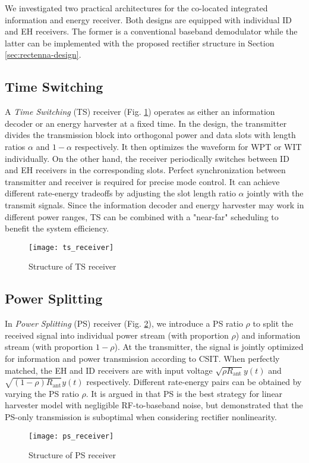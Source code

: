We investigated two practical architectures for the co-located integrated information and energy receiver. Both designs are equipped with individual ID and EH receivers. The former is a conventional baseband demodulator while the latter can be implemented with the proposed rectifier structure in Section \ref{sec:rectenna-design}.



\subsection{Time Switching}\label{sec:time-switching}
A \textit{Time Switching} (TS) receiver (Fig. \ref{fig:ts-receiver}) operates as either an information decoder or an energy harvester at a fixed time. In the design, the transmitter divides the transmission block into orthogonal power and data slots with length ratios $\alpha $ and $1 - \alpha $ respectively. It then optimizes the waveform for WPT or WIT individually. On the other hand, the receiver periodically switches between ID and EH receivers in the corresponding slots. Perfect synchronization between transmitter and receiver is required for precise mode control. It can achieve different rate-energy tradeoffs by adjusting the slot length ratio $\alpha $ jointly with the transmit signals. Since the information decoder and energy harvester may work in different power ranges, TS can be combined with a "near-far" scheduling \cite{Zhang2013} to benefit the system efficiency.

\begin{figure}[ht]
  \centering
    \texttt{[image: ts\_receiver]}
  \caption{Structure of TS receiver \cite{Clerckx2019}}
  \label{fig:ts-receiver}
\end{figure}



\subsection{Power Splitting}\label{sec:power-splitting}
In \textit{Power Splitting} (PS) receiver (Fig. \ref{fig:ps-receiver}), we introduce a PS ratio $\rho $ to split the received signal into individual power stream (with proportion $\rho $) and information stream (with proportion $1 - \rho $). At the transmitter, the signal is jointly optimized for information and power transmission according to CSIT. When perfectly matched, the EH and ID receivers are with input voltage $\sqrt {\rho {R_{{\text{ant}}}}} y(t)$ and $\sqrt {(1 - \rho ){R_{{\text{ant}}}}} y(t)$ respectively. Different rate-energy pairs can be obtained by varying the PS ratio $\rho $. It is argued in \cite{Zhang2013} that PS is the best strategy for linear harvester model with negligible RF-to-baseband noise, but \cite{Clerckx2016} demonstrated that the PS-only transmission is suboptimal when considering rectifier nonlinearity.

\begin{figure}[ht]
  \centering
    \texttt{[image: ps\_receiver]}
  \caption{Structure of PS receiver \cite{Clerckx2019}}
  \label{fig:ps-receiver}
\end{figure} 